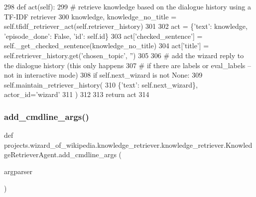\begin{DoxyCode}
298     \textcolor{keyword}{def }act(self):
299         \textcolor{comment}{# retrieve knowledge based on the dialogue history using a TF-IDF retriever}
300         knowledge, knowledge\_no\_title = self.tfidf\_retriever\_act(self.retriever\_history)
301 
302         act = \{\textcolor{stringliteral}{'text'}: knowledge, \textcolor{stringliteral}{'episode\_done'}: \textcolor{keyword}{False}, \textcolor{stringliteral}{'id'}: self.id\}
303         act[\textcolor{stringliteral}{'checked\_sentence'}] = self.\_get\_checked\_sentence(knowledge\_no\_title)
304         act[\textcolor{stringliteral}{'title'}] = self.retriever\_history.get(\textcolor{stringliteral}{'chosen\_topic'}, \textcolor{stringliteral}{''})
305 
306         \textcolor{comment}{# add the wizard reply to the dialogue history (this only happens}
307         \textcolor{comment}{# if there are labels or eval\_labels -- not in interactive mode)}
308         \textcolor{keywordflow}{if} self.next\_wizard \textcolor{keywordflow}{is} \textcolor{keywordflow}{not} \textcolor{keywordtype}{None}:
309             self.maintain\_retriever\_history(
310                 \{\textcolor{stringliteral}{'text'}: self.next\_wizard\}, actor\_id=\textcolor{stringliteral}{'wizard'}
311             )
312 
313         \textcolor{keywordflow}{return} act
314 
\end{DoxyCode}
\mbox{\label{classprojects_1_1wizard__of__wikipedia_1_1knowledge__retriever_1_1knowledge__retriever_1_1KnowledgeRetrieverAgent_a64886f913a246709fec34c1895d1d88b}} 
\subsubsection{\texorpdfstring{add\+\_\+cmdline\+\_\+args()}{add\_cmdline\_args()}}
{\footnotesize\ttfamily def projects.\+wizard\+\_\+of\+\_\+wikipedia.\+knowledge\+\_\+retriever.\+knowledge\+\_\+retriever.\+Knowledge\+Retriever\+Agent.\+add\+\_\+cmdline\+\_\+args (\begin{DoxyParamCaption}\item[{}]{argparser }\end{DoxyParamCaption})\hspace{0.3cm}{\ttfamily [static]}}

